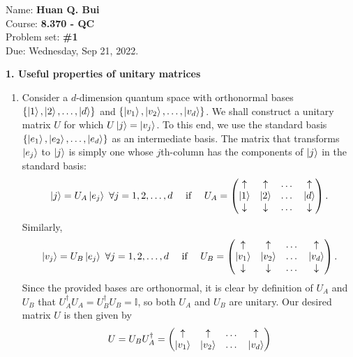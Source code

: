 \documentclass{article}
\theoremstyle{definition}
\begin{document}
\begin{framed}
\noindent Name: \textbf{Huan Q. Bui}\\
Course: \textbf{8.370 - QC}\\
Problem set: \textbf{\#1}\\
Due: Wednesday, Sep 21, 2022.
\end{framed}


\noindent \textbf{1. Useful properties of unitary matrices }

\begin{enumerate}[label=(\alph*)]
	\item Consider a $d$-dimension quantum space with orthonormal bases $\{ \ket{1}, \ket{2}, \dots, \ket{d}\}$ and $\{\ket{v_1}, \ket{v_2}, \dots, \ket{v_d}\}$. We shall construct a unitary matrix $U$ for which $U\ket{j} = \ket{v_j}$. To this end, we use the standard basis $\{ \ket{e_1}, \ket{e_2},\dots, \ket{e_d}\}$ as an intermediate basis. The matrix that transforms $\ket{e_j}$ to $\ket{j}$ is simply one whose $j$th-column has the components of $\ket{j}$ in the standard basis:
	\begin{align*}
		\ket{j} = U_A \ket{e_j} \,\, \forall j=1,2,\dots,d \quad \text{ if } \quad U_A = \begin{pmatrix}
			\uparrow & \uparrow& \dots & \uparrow\\
			\ket{1}& \ket{2}& \dots & \ket{d}\\
			\downarrow& \downarrow& \dots&\downarrow 
		\end{pmatrix}.
	\end{align*}
	Similarly, 
	\begin{align*}
		\ket{v_j} = U_B \ket{e_j} \,\, \forall j=1,2,\dots,d \quad \text{ if } \quad U_B = \begin{pmatrix}
			\uparrow & \uparrow& \dots & \uparrow\\
			\ket{v_1}& \ket{v_2}& \dots & \ket{v_d}\\
			\downarrow& \downarrow& \dots&\downarrow 
		\end{pmatrix}.
	\end{align*}
	Since the provided bases are orthonormal, it is clear by definition of $U_A$ and $U_B$ that $U_A^\dagger U_A = U_B^\dagger U_B = \mathbb{I}$, so both $U_A$ and $U_B$ are unitary. Our desired matrix $U$ is then given by 
	\begin{align*}
		U = U_B U_A^\dagger =  \begin{pmatrix}
			\uparrow & \uparrow& \dots & \uparrow\\
			\ket{v_1}& \ket{v_2}& \dots & \ket{v_d}\\

\end{pmatrix}
\end{align*}
\end{enumerate}
\end{document}
